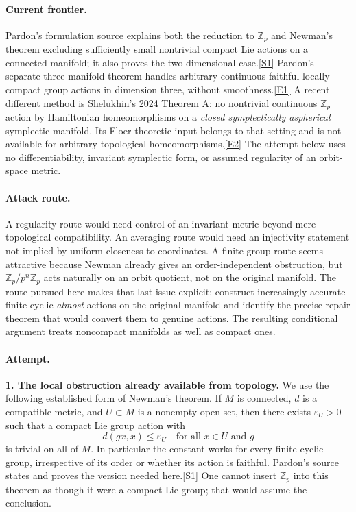 \documentclass[11pt,a4paper]{article}
\newcommand{\Z}{\mathbb{Z}}
\newcommand{\sref}[2]{\hyperlink{source:#1:#2}{[S#2]}}
\newcommand{\eref}[2]{\hyperlink{extra:#1:#2}{[E#2]}}
\begin{document}
\paragraph{Current frontier.}
Pardon's formulation source explains both the reduction to $\Z_p$ and
Newman's theorem excluding sufficiently small nontrivial compact Lie
actions on a connected manifold; it also proves the two-dimensional
case.\sref{1482}{1}
Pardon's separate three-manifold theorem handles arbitrary continuous
faithful locally compact group actions in dimension three, without
smoothness.\eref{1482}{1}
A recent different method is Shelukhin's 2024 Theorem A: no nontrivial
continuous $\Z_p$ action by Hamiltonian homeomorphisms on a \emph{closed
symplectically aspherical} symplectic manifold. Its Floer-theoretic input
belongs to that setting and is not available for arbitrary topological
homeomorphisms.\eref{1482}{2}
The attempt below uses no differentiability, invariant symplectic form,
or assumed regularity of an orbit-space metric.

\paragraph{Attack route.}
A regularity route would need control of an invariant metric beyond mere
topological compatibility. An averaging route would need an injectivity
statement not implied by uniform closeness to coordinates. A finite-group
route seems attractive because Newman already gives an order-independent
obstruction, but $\Z_p/p^n\Z_p$ acts naturally on an orbit quotient, not
on the original manifold. The route pursued here makes that last issue
explicit: construct increasingly accurate finite cyclic \emph{almost}
actions on the original manifold and identify the precise repair theorem
that would convert them to genuine actions. The resulting conditional
argument treats noncompact manifolds as well as compact ones.

\paragraph{Attempt.}
\textbf{1. The local obstruction already available from topology.}
We use the following established form of Newman's theorem. If $M$ is
connected, $d$ is a compatible metric, and $U\subset M$ is a nonempty
open set, then there exists $\varepsilon_U>0$ such that a compact Lie
group action with
\[
 d(gx,x)\le\varepsilon_U\quad\text{for all }x\in U\text{ and }g
\]
is trivial on all of $M$. In particular the constant works for every
finite cyclic group, irrespective of its order or whether its action
is faithful. Pardon's source states and proves the version needed
here.\sref{1482}{1}
One cannot insert $\Z_p$ into this theorem as though it were a compact
Lie group; that would assume the conclusion.
\end{document}
